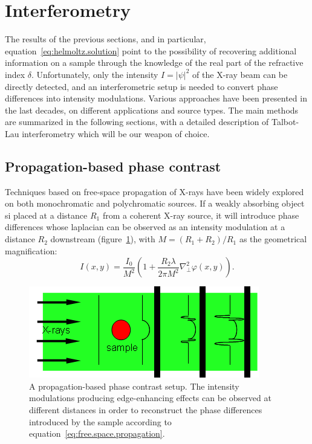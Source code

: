 \section{Interferometry}

The results of the previous sections, and in particular,
equation~\eqref{eq:helmoltz.solution} point to the possibility of recovering
additional information on a sample through the knowledge of the real part of
the refractive index $\delta$. Unfortunately, only the intensity $I =
|\psi|^2$ of the X-ray beam can be directly detected, and an interferometric
setup is needed to convert phase differences into intensity modulations.
Various approaches have been presented in the last decades, on different
applications and source types. The main methods are summarized in the
following sections, with a detailed description of Talbot-Lau interferometry
which will be our weapon of choice.

\subsection{Propagation-based phase contrast}
Techniques based on free-space propagation of X-rays have been widely
explored on both monochromatic and polychromatic sources. If a weakly
absorbing object si placed at a distance $R_1$ from a coherent X-ray source,
it will introduce phase differences whose laplacian can be observed as an
intensity modulation at a distance $R_2$ downstream (figure~\ref{fig:propagation.based}), with
$M = (R_1 + R_2) / R_1$ as the geometrical magnification:
\begin{equation}
    I(x, y) = \frac{I_0}{M^2}\left(1 + \frac{R_2\lambda}{2\pi M^2}\nabla_\perp^2
    \varphi(x, y)\right).
    \label{eq:free.space.propagation}
\end{equation}

\begin{figure}[htb]
    \centering
    \includegraphics[width=\textwidth]{gfx/propagation-based_imaging.png}
    \caption[Propagation-based setup.]{A propagation-based phase contrast
    setup\cn. The intensity modulations producing edge-enhancing effects can
be observed at different distances in order to reconstruct the phase
differences introduced by the sample according to
equation~\eqref{eq:free.space.propagation}.}
    \label{fig:propagation.based}
\end{figure}

